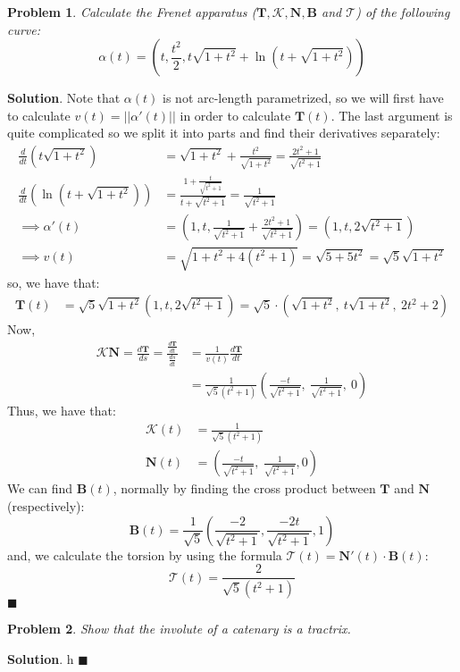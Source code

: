 \documentclass[12pt]{article}
\newcommand{\abs}[1]{\left| #1 \right|} %
\renewcommand{\=}[1]{\stackrel{#1}{=}} %
\newtheorem{p}{Problem}[section]
\theoremstyle{definition}
\newenvironment{s}{%
        \begin{trivlist} \item \textbf{Solution}. }{%
            \hspace*{\fill} $\blacksquare$\end{trivlist}}%
\begin{document}
\begin{p}
    Calculate the Frenet apparatus ($\mathbf{T}, \mathcal{K}, \mathbf{N}, \mathbf{B}$ and $\mathcal{T}$) of the
    following curve:
    \[ \alpha(t) = (t, \frac{t^2}{2}, t\sqrt{1+t^2} + \ln(t+\sqrt{1+t^2})) \]
\end{p}
\begin{s}
    Note that $\alpha(t)$ is not arc-length parametrized, so we will first have to calculate $v(t) = \abs{\abs{\alpha'(t)}}$ in order
    to calculate $\mathbf{T}(t)$. The last argument is quite complicated so we split it into parts and find their
    derivatives separately:
    \begin{align*}
        \frac{d}{dt}(t\sqrt{1+t^2}) &= \sqrt{1+t^2} + \frac{t^2}{\sqrt{1+t^2}} = \frac{2t^2+1}{\sqrt{t^2+1}} \\
        \frac{d}{dt}(\ln(t+\sqrt{1+t^2})) &= \frac{1+\frac{t}{\sqrt{t^2+1}}}{t+\sqrt{t^2+1}} = \frac{1}{\sqrt{t^2+1}} \\
        \implies \alpha'(t) &= (1, t, \frac{1}{\sqrt{t^2+1}} + \frac{2t^2+1}{\sqrt{t^2+1}}) = (1,t,2\sqrt{t^2+1}) \\
        \implies v(t) &= \sqrt{1+t^2+4(t^2+1)} = \sqrt{5+5t^2} = \sqrt{5}\sqrt{1+t^2}
    \end{align*}
    so, we have that:
    \begin{align*}
        \mathbf{T}(t) &= \sqrt{5}\sqrt{1+t^2}(1,t,2\sqrt{t^2+1}) = \sqrt{5}\cdot(\sqrt{1+t^2},\: t\sqrt{1+t^2},\: 
        2t^2+2)
    \end{align*}
    Now,
    \begin{align*}
        \mathcal{K}\mathbf{N} = \frac{d\mathbf{T}}{ds} = \frac{\frac{d\mathbf{T}}{dt}}{\frac{ds}{dt}} 
        &= \frac{1}{v(t)}\frac{d\mathbf{T}}{dt} \\
        &= \frac{1}{\sqrt{5}(t^2+1)}(\frac{-t}{\sqrt{t^2+1}},\:\frac{1}{\sqrt{t^2+1}},\:0)
    \end{align*}
    Thus, we have that:
    \begin{align*}
        \mathcal{K}(t) &= \frac{1}{\sqrt{5}(t^2+1)} \\
        \mathbf{N}(t) &= (\frac{-t}{\sqrt{t^2+1}},\:\frac{1}{\sqrt{t^2+1}}, 0)
    \end{align*}
    We can find $\mathbf{B}(t)$, normally by finding the cross product between $\mathbf{T}$ and 
    $\mathbf{N}$ (respectively):
    \[ \mathbf{B}(t) = \frac{1}{\sqrt{5}}(\frac{-2}{\sqrt{t^2+1}}, \frac{-2t}{\sqrt{t^2+1}}, 1) \]
    and, we calculate the torsion by using the formula $\mathcal{T}(t) = \mathbf{N}'(t)\cdot\mathbf{B}(t)$:
    \[ \mathcal{T}(t) = \frac{2}{\sqrt{5}(t^2+1)} \]
\end{s}

\begin{p}
    Show that the involute of a catenary is a tractrix.
\end{p}
\begin{s}
    h
\end{s}
\end{document}
